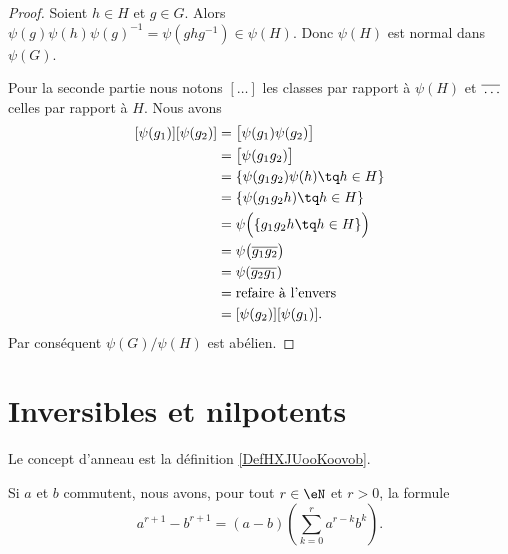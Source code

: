 \begin{proof}
	Soient \( h\in H\) et \( g\in G\). Alors \( \psi(g)\psi(h)\psi(g)^{-1}=\psi(ghg^{-1})\in\psi(H)\). Donc \( \psi(H)\) est normal dans \( \psi(G)\).

	Pour la seconde partie nous notons \( [\ldots]\) les classes par rapport à \( \psi(H)\) et \( \overline{ \vphantom{g}\ldots }\) celles par rapport à \( H\). Nous avons
	\begin{subequations}
		\begin{align}
			[\psi(g_1)][\psi(g_2)] & =\big[ \psi(g_1)\psi(g_2) \big]            \\
			                       & =\big[ \psi(g_1g_2) \big]                  \\
			                       & =\{ \psi(g_1g_2)\psi(h)\tq h\in H \}       \\
			                       & =\{ \psi(g_1g_2h)\tq h\in H \}             \\
			                       & =\psi\Big(  \{ g_1g_2h\tq h\in H \}  \Big) \\
			                       & =\psi\big( \overline{ g_1g_2 } \big)       \\
			                       & =\psi(\overline{ g_2g_1 })                 \\
			                       & =\text{refaire à l'envers}                 \\
			                       & =[\psi(g_2)][\psi(g_1)].
		\end{align}
	\end{subequations}
	Par conséquent \( \psi(G)/\psi(H)\) est abélien.
\end{proof}

\section{Inversibles et nilpotents}

Le concept d'anneau est la définition \ref{DefHXJUooKoovob}.

\begin{lemma}       \label{LEMooOYZEooLivKWI}
	Si \( a\) et \( b\) commutent, nous avons, pour tout \( r \in \eN \) et \( r > 0\), la formule
	\begin{equation}        \label{Eqarpurmkbk}
		a^{r+1}-b^{r+1}=(a-b)\left(\sum_{k=0}^ra^{r-k}b^k\right).
	\end{equation}
\end{lemma}

